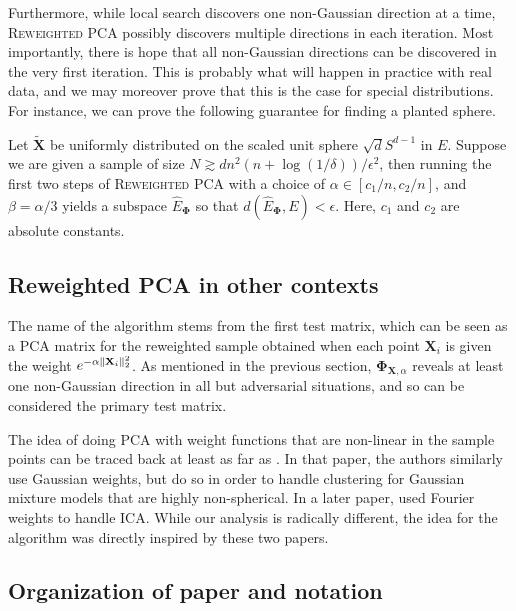 \documentclass[final,12pt]{colt2018} %
\numberwithin{equation}{section}
\DeclarePairedDelimiter{\norm}{\lVert}{\rVert}
\newcommand{\boldPhi}{\boldsymbol{\Phi}}
\newcommand{\boldX}{\textbf{X}}
\begin{document}
Furthermore, while local search discovers one non-Gaussian direction at a time, \textsc{Reweighted PCA} possibly discovers multiple directions in each iteration. Most importantly, there is hope that all non-Gaussian directions can be discovered in the very first iteration. This is probably what will happen in practice with real data, and we may moreover prove that this is the case for special distributions. For instance, we can prove the following guarantee for finding a planted sphere.

\begin{corollary} \label{cor:finding_a_sphere}
	Let $\tilde{\boldX}$ be uniformly distributed on the scaled unit sphere $\sqrt{d}S^{d-1}$ in $E$. Suppose we are given a sample of size $N \gtrsim dn^2(n+\log(1/\delta))/\epsilon^2$, then running the first two steps of \textsc{Reweighted PCA} with a choice of $\alpha \in [c_1/n, c_2/n]$, and $\beta = \alpha/3$ yields a subspace $\hat{E}_{\boldPhi}$ so that $d(\hat{E}_{\boldPhi},E) < \epsilon$. Here, $c_1$ and $c_2$ are absolute constants.
\end{corollary}

\subsection{Reweighted PCA in other contexts}

The name of the algorithm stems from the first test matrix, which can be seen as a PCA matrix for the reweighted sample obtained when each point $\boldX_i$ is given the weight $e^{-\alpha\norm{\boldX_i}_2^2}$. As mentioned in the previous section, $\boldPhi_{\boldX,\alpha}$ reveals at least one non-Gaussian direction in all but adversarial situations, and so can be considered the primary test matrix.

The idea of doing PCA with weight functions that are non-linear in the sample points can be traced back at least as far as \cite{Brubaker2008b}. In that paper, the authors similarly use Gaussian weights, but do so in order to handle clustering for Gaussian mixture models that are highly non-spherical. In a later paper, \cite{Goyal2014a} used Fourier weights to handle ICA. While our analysis is radically different, the idea for the algorithm was directly inspired by these two papers.

\subsection{Organization of paper and notation}
\end{document}
